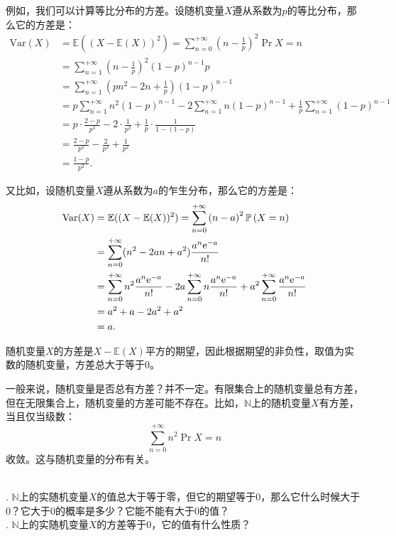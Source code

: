 \documentclass[12pt,UTF8,fontset=none]{ctexbook}
\begin{document}
例如，我们可以计算等比分布的方差。设随机变量$X$遵从系数为$p$的等比分布，那么它的方差是：
\begin{align*}
    \text{Var}(X) &= \mathbb{E}((X - \mathbb{E}(X))^2) = \sum_{n=0}^{+\infty} \left(n - \frac{1}{p}\right)^2 \Pr{X=n} \\
    &= \sum_{n=1}^{+\infty} \left(n - \frac{1}{p}\right)^2 (1 - p)^{n-1} p \\
    &= \sum_{n=1}^{+\infty} \left(pn^2 - 2n + \frac{1}{p}\right) (1 - p)^{n-1} \\
    &= p\sum_{n=1}^{+\infty} n^2 (1 - p)^{n-1} - 2\sum_{n=1}^{+\infty} n (1 - p)^{n-1} + \frac{1}{p}\sum_{n=1}^{+\infty} (1 - p)^{n-1} \\
    &= p\cdot \frac{2 - p}{p^3} - 2\cdot \frac{1}{p^2} + \frac{1}{p}\cdot \frac{1}{1 - (1 - p)} \\
    &= \frac{2 - p}{p^2} - \frac{2}{p^2} + \frac{1}{p^2} \\
    &= \frac{1 - p}{p^2}.
\end{align*}

又比如，设随机变量$X$遵从系数为$a$的乍生分布，那么它的方差是：
\begin{align*}
    \text{Var}(X) &= \mathbb{E}((X - \mathbb{E}(X))^2) = \sum_{n=0}^{+\infty} \left(n - a\right)^2 \mathbb{P}\left(X=n\right) \\
    &= \sum_{n=0}^{+\infty} (n^2 - 2an + a^2) \frac{a^n\mathrm{e}^{-a}}{n!} \\
    &= \sum_{n=0}^{+\infty} n^2 \frac{a^n\mathrm{e}^{-a}}{n!} - 2a\sum_{n=0}^{+\infty} n \frac{a^n\mathrm{e}^{-a}}{n!} + a^2\sum_{n=0}^{+\infty} \frac{a^n\mathrm{e}^{-a}}{n!} \\
    &= a^2 + a - 2a^2 + a^2 \\
    &= a.
\end{align*}

随机变量$X$的方差是$X - \mathbb{E}(X)$平方的期望，因此根据期望的非负性，取值为实数的随机变量，方差总大于等于$0$。

一般来说，随机变量是否总有方差？并不一定。有限集合上的随机变量总有方差，但在无限集合上，随机变量的方差可能不存在。比如，$\mathbb{N}$上的随机变量$X$有方差，当且仅当级数：
\[
    \sum_{n=0}^{+\infty} n^2 \Pr{X=n}
\]
收敛。这与随机变量的分布有关。

\begin{sk}
    \mbox{}\\
    . $\mathbb{N}$上的实随机变量$X$的值总大于等于零，但它的期望等于$0$，那么它什么时候大于$0$？它大于$0$的概率是多少？它能不能有大于$0$的值？\\
    . $\mathbb{N}$上的实随机变量$X$的方差等于$0$，它的值有什么性质？
\end{sk}
\end{document}
